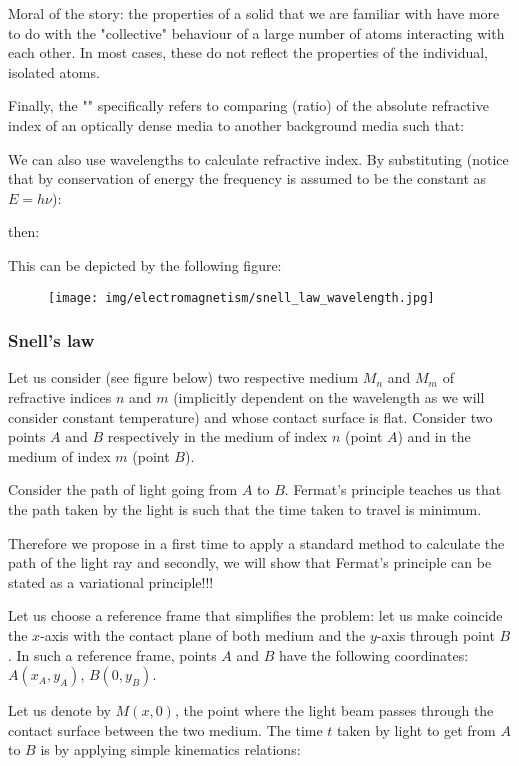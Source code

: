 	Moral of the story: the properties of a solid that we are familiar with have more to do with the "collective" behaviour of a large number of atoms interacting with each other. In most cases, these do not reflect the properties of the individual, isolated atoms.
	
	Finally, the "" specifically refers to comparing (ratio) of the absolute refractive index of an optically dense media to another background media such that:
	
	We can also use wavelengths to calculate refractive index. By substituting (notice that by conservation of energy the frequency is assumed to be the constant as $E=h \nu$):
	
	then:
	
	This can be depicted by the following figure:
	\begin{figure}[H]
		\centering
		\texttt{[image: img/electromagnetism/snell\_law\_wavelength.jpg]}
	\end{figure}
	
	\pagebreak
	\subsubsection{Snell's law}
	Let us consider (see figure below) two respective medium $M_n$ and $M_m$ of refractive indices $n$ and $m$ (implicitly dependent on the wavelength as we will consider constant temperature) and whose contact surface is flat. Consider two points $A$ and $B$ respectively in the medium of index $n$ (point $A$) and in the medium of index $m$ (point $B$).

	Consider the path of light going from $A$ to $B$. Fermat's principle teaches us that the path taken by the light is such that the time taken to travel is minimum.

	Therefore we propose in a first time to apply a standard method to calculate the path of the light ray and secondly, we will show that Fermat's principle can be stated as a variational principle!!!
	
	Let us choose a reference frame that simplifies the problem: let us make coincide the $x$-axis with the contact plane of both medium and the $y$-axis through point $B$. In such a reference frame, points $A$ and $B$ have the following coordinates: $A(x_A,y_A)$, $B(0,y_B)$.
	
	Let us denote by $M(x,0)$, the point where the light beam passes through the contact surface between the two medium. The time $t$ taken by light to get from $A$ to $B$ is by applying simple kinematics relations:
	
